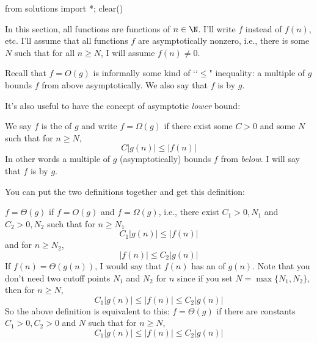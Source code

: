 \begin{python0}
from solutions import *; clear()
\end{python0}

In this section, all functions are functions of $n \in \N$.
I'll write $f$ instead of $f(n)$, etc.
I'll assume that all functions $f$ are asymptotically nonzero, i.e.,
there is some $N$ such that for all $n \geq N$, I will assume $f(n) \neq 0$.

Recall that $f = O(g)$ is
informally some kind of \lq\lq $\leq$" inequality:
a multiple of $g$ bounds $f$ from above asymptotically.
We also say that $f$ is  by $g$.

It's also useful to have the concept of asymptotic \textit{lower} bound:

\begin{defn}
  We
  say $f$ is the  of $g$ and 
  write $f = \Omega(g)$ if
  there exist some $C > 0$ and some $N$ such that 
  for $n \geq N$,
  \[
  C|g(n)| \leq |f(n)|
  \]
  In other words a multiple of $g$ (asymptotically)
  bounds $f$ from \textit{below}.
  I will say that $f$ is  by $g$.
\end{defn}

You can put the two definitions together and get this definition:

\begin{defn}
$f = \Theta(g)$ if $f = O(g)$ and $f = \Omega(g)$, i.e., 
there exist $C_1 > 0, N_1$ and $C_2 > 0, N_2$ such that
for $n \geq N_1$
\[
C_1|g(n)| \leq |f(n)|
\]
and for $n \geq N_2$,
\[
|f(n)| \leq C_2 |g(n)|
\]
If $f(n) = \Theta(g(n))$, I would say that
$f(n)$ has an  of $g(n)$.
Note that you don't need two cutoff points $N_1$ and $N_2$ for $n$
since if you
set $N = \max \{ N_1, N_2 \}$, then for $n \geq N$,
\[
C_1|g(n)| \leq |f(n)| \leq C_2 |g(n)|
\]
So the above definition is equivalent to this:
$f = \Theta(g)$ if there are constants $C_1 > 0, C_2 > 0$ and $N$ such that
for $n \geq N$,
\[
C_1|g(n)| \leq |f(n)| \leq C_2 |g(n)|
\]
\end{defn}

